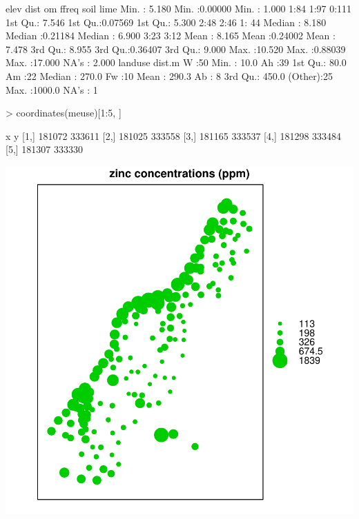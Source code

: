 \documentclass[a4paper]{article}
\begin{document}
\begin{Schunk}
\begin{Soutput}
      elev             dist               om         ffreq  soil   lime   
 Min.   : 5.180   Min.   :0.00000   Min.   : 1.000   1:84   1:97   0:111  
 1st Qu.: 7.546   1st Qu.:0.07569   1st Qu.: 5.300   2:48   2:46   1: 44  
 Median : 8.180   Median :0.21184   Median : 6.900   3:23   3:12          
 Mean   : 8.165   Mean   :0.24002   Mean   : 7.478                        
 3rd Qu.: 8.955   3rd Qu.:0.36407   3rd Qu.: 9.000                        
 Max.   :10.520   Max.   :0.88039   Max.   :17.000                        
                                    NA's   : 2.000                        
    landuse       dist.m      
 W      :50   Min.   :  10.0  
 Ah     :39   1st Qu.:  80.0  
 Am     :22   Median : 270.0  
 Fw     :10   Mean   : 290.3  
 Ab     : 8   3rd Qu.: 450.0  
 (Other):25   Max.   :1000.0  
 NA's   : 1                   
\end{Soutput}
\begin{Sinput}
> coordinates(meuse)[1:5, ]
\end{Sinput}
\begin{Soutput}
          x      y
[1,] 181072 333611
[2,] 181025 333558
[3,] 181165 333537
[4,] 181298 333484
[5,] 181307 333330
\end{Soutput}
\end{Schunk}

\includegraphics{gstat-002}
\end{document}
